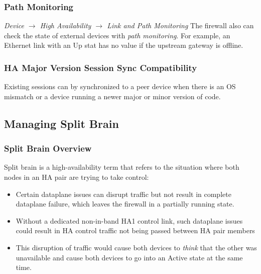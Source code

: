 \subsubsection{Path Monitoring}
\textit{Device $\rightarrow$ High Availability $\rightarrow$ Link and Path Monitoring}
\newline
The firewall also can check the state of external devices with \textit{path monitoring}.
For example, an Ethernet link with an Up stat has no value if the upstream gateway is offline.

\subsubsection{HA Major Version Session Sync Compatibility}
Existing sessions can by synchronized to a peer device when there is an OS mismatch or a device running a newer major or minor version of code.

\subsection{Managing Split Brain}
\subsubsection{Split Brain Overview}
Split brain is a high-availability term that refers to the situation where both nodes in an HA pair are trying to take control:
\begin{itemize}
    \item Certain dataplane issues can disrupt traffic but not result in complete dataplane failure, which leaves the firewall in a partially running state.
    \item Without a dedicated non-in-band HA1 control link, such dataplane issues could result in HA control traffic not being passed between HA pair members
    \item This disruption of traffic would cause both devices to \textit{think} that the other was unavailable and cause both devices to go into an Active state at the same time.
\end{itemize}


